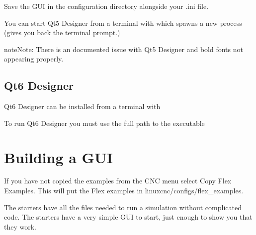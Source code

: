 \documentclass[letterpaper,10pt,english]{sphinxmanual}
\begin{document}
\sphinxAtStartPar
Save the GUI in the configuration directory alongside your .ini file.

\sphinxAtStartPar
You can start Qt5 Designer from a terminal with  which spawns a new
process (gives you back the terminal prompt.)

\begin{sphinxadmonition}{note}{Note:}
\sphinxAtStartPar
There is an documented issue with Qt5 Designer and bold fonts not
appearing properly.
\end{sphinxadmonition}


\section{Qt6 Designer}
\label{\detokenize{designer:qt6-designer}}
\sphinxAtStartPar
Qt6 Designer can be installed from a terminal with

\begin{sphinxVerbatim}[commandchars=\\\{\}]
   
\end{sphinxVerbatim}

\sphinxAtStartPar
To run Qt6 Designer you must use the full path to the executable

\begin{sphinxVerbatim}[commandchars=\\\{\}]
\end{sphinxVerbatim}

\sphinxstepscope


\chapter{Building a GUI}
\label{\detokenize{build:building-a-gui}}\label{\detokenize{build::doc}}
\sphinxAtStartPar
If you have not copied the examples from the CNC menu select Copy Flex Examples.
This will put the Flex examples in linuxcnc/configs/flex\_examples.

\sphinxAtStartPar
The starters have all the files needed to run a simulation without complicated
code. The starters have a very simple GUI to start, just enough to show you that
they work.
\end{document}
